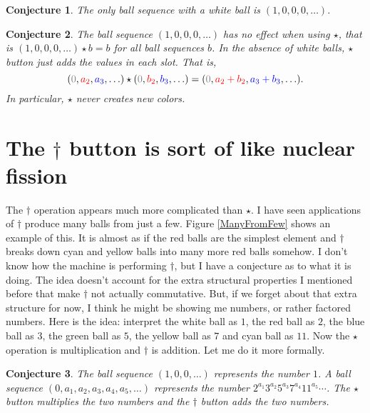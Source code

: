 \documentclass[12pt]{article}
\newtheorem{conjecture}{Conjecture}
\begin{document}
\begin{conjecture}
The only ball sequence with a white ball is $(1,0,0,0,\ldots)$.
\end{conjecture}
\begin{conjecture}
The ball sequence $(1,0,0,0,\ldots)$ has no effect when using $\star$, that is $(1,0,0,0,\ldots) \star b = b$ for all ball sequences $b$.
In the absence of white balls, $\star$ button just adds the values in each slot.  That is,
\[(\textcolor{gray}{0},\textcolor{red}{a_2},\textcolor{blue}{a_3},\ldots) \star
(\textcolor{gray}{0},\textcolor{red}{b_2},\textcolor{blue}{b_3}, \ldots) = (\textcolor{gray}{0},\textcolor{red}{a_2+b_2},\textcolor{blue}{a_3+b_3}, \ldots).\]  In particular, $\star$ never creates new colors.
\end{conjecture}

\section{The $\dagger$ button is sort of like nuclear fission}
The $\dagger$ operation appears much more complicated than $\star$. I have seen applications of $\dagger$ produce many balls from just a few.  Figure \ref{ManyFromFew} shows an example of this.  It is almost as if the red balls are
the simplest element and $\dagger$ breaks down cyan and yellow balls into many more red balls somehow.  I don't know how the machine is performing $\dagger$, but I have a conjecture
as to what it is doing.  The idea doesn't account for the extra structural properties I mentioned before that make $\dagger$ not actually commutative.  But, if we forget about that extra
structure for now, I think he might be showing me numbers, or rather factored numbers.  Here is the idea:  interpret the white ball as $1$, the red ball as $2$, the blue ball as $3$, the green ball
as $5$, the yellow ball as $7$ and cyan ball as $11$.  Now the $\star$ operation is multiplication and $\dagger$ is addition.  Let me do it more formally.

\begin{conjecture}
The ball sequence $(1,0,0,\ldots)$ represents the number $1$.  A ball sequence $(0, a_1, a_2, a_3, a_4, a_5, \ldots)$ represents the number $2^{a_1}3^{a_2}5^{a_3}7^{a_4}11^{a_5}\cdots$.
The $\star$ button multiplies the two numbers and the $\dagger$ button adds the two numbers.
\end{conjecture}
\end{document}
